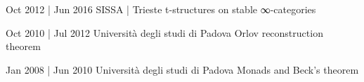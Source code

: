 \begin{eyenumerate}
   \item {}
   {Oct 2012 | Jun 2016}
   {SISSA | Trieste}
   {t-structures on stable ∞-categories}
   \item {}
   {Oct 2010 | Jul 2012}
   {Università degli studi di Padova}
   {Orlov reconstruction theorem}
   \item {}
   {Jan 2008 | Jun 2010}
   {Università degli studi di Padova}
   {Monads and Beck's theorem}
\end{eyenumerate}
